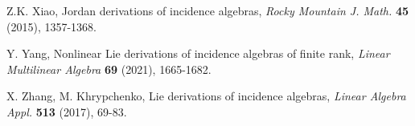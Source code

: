 \documentclass[reqno]{amsart}
\numberwithin{equation}{section}
\theoremstyle{plain}
\theoremstyle{definition}
\begin{document}
\begin{thebibliography}{}
 Z.K. Xiao, Jordan derivations of incidence algebras,
{\em Rocky Mountain J. Math.} {\bf 45} (2015), 1357-1368.

 Y. Yang, Nonlinear Lie derivations of incidence algebras of finite rank,
{\em Linear Multilinear Algebra} {\bf 69} (2021), 1665-1682.

 X. Zhang, M. Khrypchenko, Lie derivations of incidence algebras,
{\em Linear Algebra Appl.} {\bf 513} (2017), 69-83.























\end{thebibliography}
\end{document}
